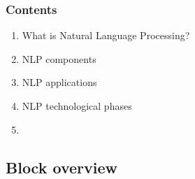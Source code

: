 \documentclass{beamer}
\begin{document}
\begin{frame}

    \frametitle{Contents}

	\large

    \begin{enumerate}
  
    	\item What is Natural Language Processing?
    	\item NLP components
    	\item NLP applications
    	\item NLP technological phases
    	\item {\bf \color{blue}{Planning for the block}}
    
    \end{enumerate}

\end{frame}






\subsection{Block overview}
\end{document}
